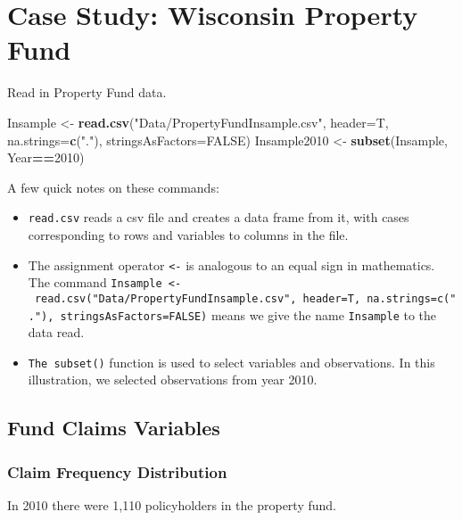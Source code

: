 \documentclass[]{book}
\newenvironment{Shaded}{\begin{snugshade}}{\end{snugshade}}
\newcommand{\KeywordTok}[1]{\textcolor[rgb]{0.13,0.29,0.53}{\textbf{#1}}}
\newcommand{\DataTypeTok}[1]{\textcolor[rgb]{0.13,0.29,0.53}{#1}}
\newcommand{\DecValTok}[1]{\textcolor[rgb]{0.00,0.00,0.81}{#1}}
\newcommand{\StringTok}[1]{\textcolor[rgb]{0.31,0.60,0.02}{#1}}
\newcommand{\OtherTok}[1]{\textcolor[rgb]{0.56,0.35,0.01}{#1}}
\newcommand{\OperatorTok}[1]{\textcolor[rgb]{0.81,0.36,0.00}{\textbf{#1}}}
\newcommand{\NormalTok}[1]{#1}
\theoremstyle{definition}
\theoremstyle{definition}
\theoremstyle{definition}
\theoremstyle{remark}
\begin{document}
\section{Case Study: Wisconsin Property
Fund}\label{case-study-wisconsin-property-fund}

Read in Property Fund data.

\begin{Shaded}
\begin{Highlighting}[]
\NormalTok{Insample <-}\StringTok{ }\KeywordTok{read.csv}\NormalTok{(}\StringTok{"Data/PropertyFundInsample.csv"}\NormalTok{, }\DataTypeTok{header=}\NormalTok{T, }\DataTypeTok{na.strings=}\KeywordTok{c}\NormalTok{(}\StringTok{"."}\NormalTok{), }\DataTypeTok{stringsAsFactors=}\OtherTok{FALSE}\NormalTok{)}
\NormalTok{Insample2010 <-}\StringTok{ }\KeywordTok{subset}\NormalTok{(Insample, Year}\OperatorTok{==}\DecValTok{2010}\NormalTok{)}
\end{Highlighting}
\end{Shaded}

A few quick notes on these commands:

\begin{itemize}
\item
  \texttt{read.csv} reads a csv file and creates a data frame from it,
  with cases corresponding to rows and variables to columns in the file.
\item
  The assignment operator \texttt{\textless{}-} is analogous to an equal
  sign in mathematics. The command
  \texttt{Insample\ \textless{}-\ read.csv("Data/PropertyFundInsample.csv",\ header=T,\ na.strings=c("."),\ stringsAsFactors=FALSE)}
  means we give the name \texttt{Insample} to the data read.
\item
  \texttt{The\ subset()} function is used to select variables and
  observations. In this illustration, we selected observations from year
  2010.
\end{itemize}

\subsection{Fund Claims Variables}\label{fund-claims-variables}

\subsubsection{Claim Frequency
Distribution}\label{claim-frequency-distribution}

In 2010 there were 1,110 policyholders in the property fund.
\end{document}
